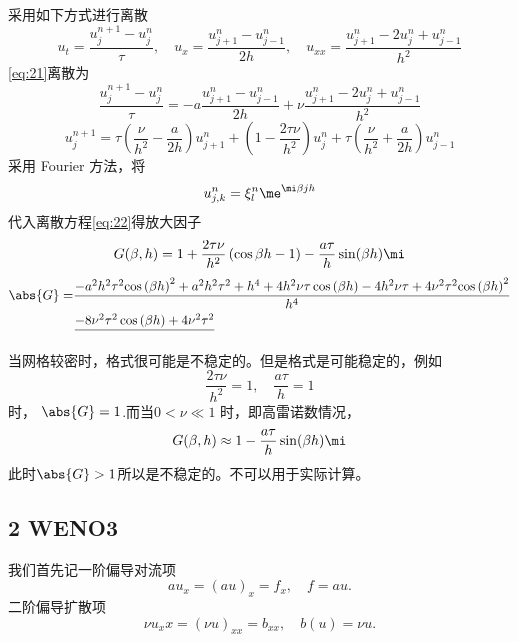 \documentclass[12pt]{article}
\begin{document}
采用如下方式进行离散
\begin{equation}
	u_t = \frac{u^{n+1}_{j}-u^{n}_{j}}{\tau},\quad u_x = \frac{u^n_{j+1}-u^n_{j-1}}{2h},\quad u_{xx} = \frac{u^n_{j+1}-2u^n_{j}+u^n_{j-1}}{h^2}
\end{equation}
\cref{eq:21}离散为
\begin{equation}
	\frac{u^{n+1}_{j}-u^{n}_{j}}{\tau} = -a\frac{u^n_{j+1}-u^n_{j-1}}{2h}+\nu \frac{u^n_{j+1}-2u^n_{j}+u^n_{j-1}}{h^2}
\end{equation}
\begin{equation}
	u^{n+1}_{j} = \tau \left( \frac{\nu}{h^2} - \frac{a}{2h} \right)u^n_{j+1} + \left( 1 - \frac{2\tau\nu}{h^2} \right)u^n_{j} + \tau \left( \frac{\nu}{h^2} + \frac{a}{2h} \right)u^n_{j-1}
	\label{eq:22}
\end{equation}
采用 Fourier 方法，将
\begin{equation}
	u^n_{j,k} = \xi^n_l \me^{\mi \beta jh}
\end{equation}
代入离散方程\cref{eq:22}得放大因子
\begin{equation}
	G(\beta,h) = 1+\frac{2\tau \nu}{h^2}\left( \cos \beta h-1 \right) - \frac{a\tau}{h} \sin(\beta h) \mi
\end{equation}
\begin{equation}
	\begin{aligned}
		\abs{G} = & \frac{-a^2 h^2 \tau^2 {\cos \left(\beta h\right)}^2 +a^2 h^2 \tau^2 +h^4 +4h^2 \nu\tau\cos \left(\beta h\right)-4h^2 \nu\tau+4\nu^2 \tau^2 {\cos \left(\beta h\right)}^2 }{h^4 } \\
		          & \frac{-8\nu^2 \tau^2 \cos \left(\beta h\right)+4\nu^2 \tau^2 }{}
	\end{aligned}
\end{equation}
当网格较密时，格式很可能是不稳定的。但是格式是可能稳定的，例如
\begin{equation}
	\frac{2\tau \nu}{h^2} = 1,\quad \frac{a\tau}{h} = 1
\end{equation}
时， $\abs{G}=1$.而当$0<\nu \ll 1$ 时，即高雷诺数情况，
\begin{equation}
	G(\beta,h) \approx 1 - \frac{a\tau}{h} \sin(\beta h) \mi
\end{equation}
此时$\abs{G}>1$所以是不稳定的。不可以用于实际计算。


\subsection{2 WENO3}

我们首先记一阶偏导对流项
\begin{equation}
	au_x = \left( au \right)_x = f_x,\quad f = au.
\end{equation}
二阶偏导扩散项
\begin{equation}
	\nu u_xx = (\nu u)_{xx} = b_{xx},\quad b(u) = \nu u.
\end{equation}
\end{document}
